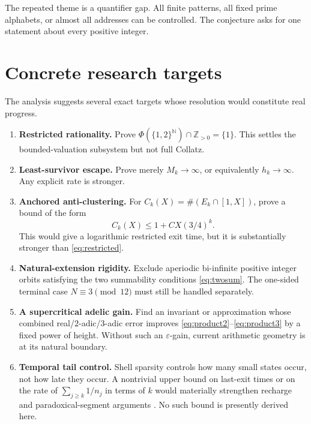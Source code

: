 \documentclass[11pt,reqno]{amsart}
\theoremstyle{plain}
\theoremstyle{definition}
\numberwithin{equation}{section}
\newcommand{\N}{\mathbb{N}}
\newcommand{\Z}{\mathbb{Z}}
\begin{document}
The repeated theme is a quantifier gap.  All finite patterns, all fixed prime
alphabets, or almost all addresses can be controlled.  The conjecture asks for
one statement about every positive integer.

\section{Concrete research targets}
\label{sec:targets}

The analysis suggests several exact targets whose resolution would constitute
real progress.

\begin{enumerate}
  \item \textbf{Restricted rationality.} Prove
        $\Phi(\{1,2\}^{\N})\cap\Z_{>0}=\{1\}$.  This settles the
        bounded-valuation subsystem but not full Collatz.

  \item \textbf{Least-survivor escape.} Prove merely $M_k\to\infty$, or
        equivalently $h_k\to\infty$.  Any explicit rate is stronger.

  \item \textbf{Anchored anti-clustering.} For
        $C_k(X)=\#(E_k\cap[1,X])$, prove a bound of the form
        \[
        C_k(X)\le1+C X(3/4)^k.
        \]
        This would give a logarithmic restricted exit time, but it is
        substantially stronger than \eqref{eq:restricted}.

  \item \textbf{Natural-extension rigidity.} Exclude aperiodic bi-infinite
        positive integer orbits satisfying the two summability conditions
        \eqref{eq:twosum}.  The one-sided terminal case $N\equiv3\pmod{12}$
        must still be handled separately.

  \item \textbf{A supercritical adelic gain.} Find an invariant or
        approximation whose combined real/$2$-adic/$3$-adic error improves
        \eqref{eq:product2}--\eqref{eq:product3} by a fixed power of height.
        Without such an $\varepsilon$-gain, current arithmetic geometry is at
        its natural boundary.

  \item \textbf{Temporal tail control.} Shell sparsity controls how many small
        states occur, not how late they occur.  A nontrivial upper bound on
        last-exit times or on the rate of $\sum_{j\ge k}1/n_j$ in terms of $k$
        would materially strengthen recharge and paradoxical-segment
        arguments \cite{rozierterracol2026}.  No such bound is presently
        derived here.
\end{enumerate}
\end{document}

